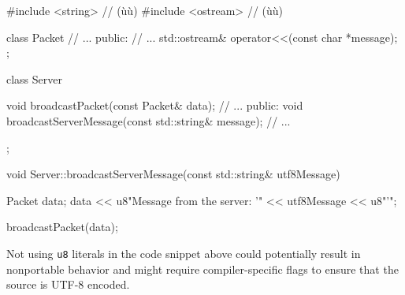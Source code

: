 \begin{emcppshiddenlisting}[emcppsbatch=e1]
#include <string>   // (ù{}ù)
#include <ostream>  // (ù{}ù)

class Packet                                                                    
{                                                                               
    // ...                                                                      
public:                                                                         
    // ...                                                                      
    std::ostream&  operator<<(const char *message);                             
};                                                                              
                                                                                
                                                                                
class Server                                                                    
{                                                                               
    void broadcastPacket(const Packet& data);                                   
    // ...                                                                      
public:                                                                         
    void broadcastServerMessage(const std::string& message);                    
    // ...                                                                      
                                                                                
};                                                                              
                                                                                
\end{emcppshiddenlisting}
\begin{emcppslisting}[emcppsbatch=e1]
void Server::broadcastServerMessage(const std::string& utf8Message)
{
    Packet data;
    data << u8"Message from the server: '" << utf8Message << u8"'\n";

    broadcastPacket(data);
}
\end{emcppslisting}
    
\noindent Not using \lstinline!u8! literals in the code snippet above could potentially result in
nonportable behavior and might require compiler-specific flags to
ensure that the source is UTF-8 encoded.

